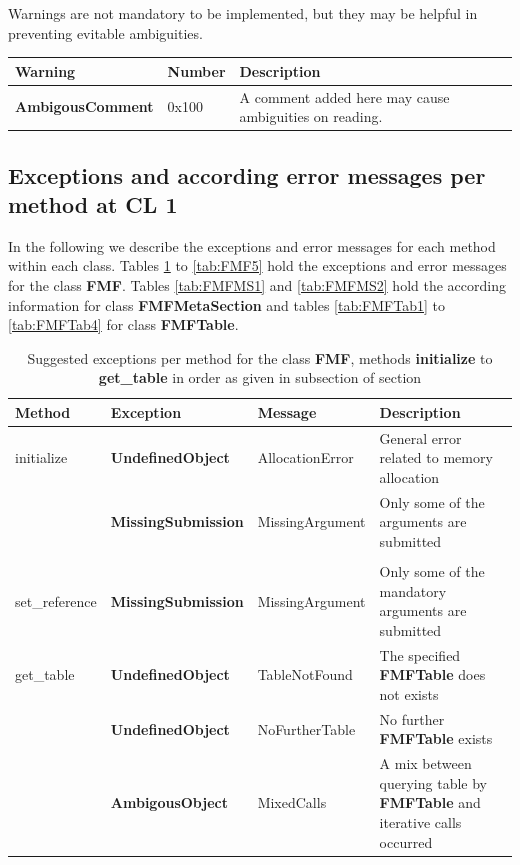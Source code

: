 \documentclass[10pt,utf8, mainlanguage=english]{ufcd-info}
\newcommand{\fmfobj}[1]{{\textbf{\textsf{#1}}}}
\begin{document}
Warnings are not mandatory to be implemented, but they may be helpful in preventing evitable ambiguities.

\begin{tabular}{l|l|p{5cm}}
Warning & Number & Description \\
\hline
\fmfobj{AmbigousComment} & 0x100 & A comment added here may cause ambiguities on reading.
\end{tabular}

\subsection{Exceptions and according error messages per method at CL 1}

In the following we describe the exceptions and error messages for each method within each class. Tables \ref{tab:FMF1} to \ref{tab:FMF5} hold the exceptions and error messages for the class \fmfobj{FMF}. Tables \ref{tab:FMFMS1} and \ref{tab:FMFMS2} hold the according information for class \fmfobj{FMFMetaSection} and tables \ref{tab:FMFTab1} to \ref{tab:FMFTab4} for class \fmfobj{FMFTable}.

\begin{table}\label{tab:FMF1}
\caption{Suggested exceptions per method for the class \fmfobj{FMF}, methods \fmfobj{initialize} to \fmfobj{get\_table} in order as given in subsection  of section \newline}
\begin{tabular}{l|l|l|p{5cm}}
Method & Exception & Message & Description \\
\hline
initialize & \fmfobj{UndefinedObject} & AllocationError & General error related to memory allocation\\
               & \fmfobj{MissingSubmission} & MissingArgument & Only some of the arguments are submitted \\
 & & \\
set\_reference & \fmfobj{MissingSubmission} & MissingArgument & Only some of the mandatory arguments are submitted \\
get\_table & \fmfobj{UndefinedObject} & TableNotFound & The specified \fmfobj{FMFTable} does not exists \\
                            & \fmfobj{UndefinedObject} & NoFurtherTable & No further \fmfobj{FMFTable} exists \\
                            & \fmfobj{AmbigousObject} & MixedCalls & A mix between querying table by \fmfobj{FMFTable} and iterative calls occurred
\end{tabular}
\label{tab:FMF1}
\end{table}
\end{document}
